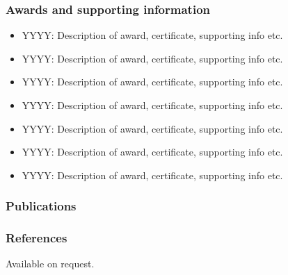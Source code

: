 \documentclass[11pt, a4paper]{article}
\providecommand{\tightlist}{%
  \setlength{\itemsep}{0pt}\setlength{\parskip}{0pt}}
\begin{document}
\begin{raggedright}
\subsubsection{Awards and supporting information}

\begin{itemize}
\tightlist
\item
  YYYY: Description of award, certificate, supporting info etc.
\item
  YYYY: Description of award, certificate, supporting info etc.
\item
  YYYY: Description of award, certificate, supporting info etc.
\item
  YYYY: Description of award, certificate, supporting info etc.
\item
  YYYY: Description of award, certificate, supporting info etc.
\item
  YYYY: Description of award, certificate, supporting info etc.
\item
  YYYY: Description of award, certificate, supporting info etc.
\end{itemize}

\subsubsection{Publications}


\subsubsection{References}

Available on request.
\end{raggedright}
\end{document}
